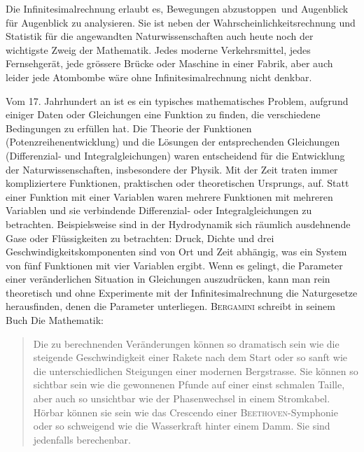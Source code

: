 \documentclass[%
11pt,%
twoside,%
titlepage,%
german,%
headsepline%
]{scrartcl}
\begin{document}
Die Infinitesimalrechnung erlaubt es, \glqq Bewegungen abzustoppen\grqq\ und Augenblick f\"ur Augenblick zu analysieren. Sie ist neben der Wahrscheinlichkeitsrechnung und Statistik f\"ur die angewandten Naturwissenschaften auch heute noch der wichtigste Zweig der Mathematik. Jedes moderne Verkehrsmittel, jedes Fernsehger\"at, jede gr\"ossere Br\"ucke oder Maschine in einer Fabrik, aber auch leider jede Atombombe w\"are ohne Infinitesimalrechnung nicht denkbar.

Vom 17. Jahrhundert an ist es ein typisches mathematisches Problem, aufgrund einiger Daten oder Gleichungen eine Funktion zu finden, die verschiedene Bedingungen zu erf\"ullen hat. Die Theorie der Funktionen (Potenzreihenentwicklung) und die L\"osungen der entsprechenden Gleichungen (Differenzial- und Integralgleichungen) waren entscheidend f\"ur die Entwicklung der Naturwissenschaften, insbesondere der Physik. Mit der Zeit traten immer kompliziertere Funktionen, praktischen oder theoretischen Ursprungs, auf. Statt einer Funktion mit einer Variablen waren mehrere Funktionen mit mehreren Variablen und sie verbindende Differenzial- oder Integralgleichungen zu betrachten. Beispielsweise sind in der Hydrodynamik sich r\"aumlich ausdehnende Gase oder Fl\"ussigkeiten zu betrachten: Druck, Dichte und drei Geschwindigkeitskomponenten sind von Ort und Zeit abh\"angig, was ein System von f\"unf Funktionen mit vier Variablen ergibt.
Wenn es gelingt, die Parameter einer ver\"anderlichen Situation in Gleichungen auszudr\"ucken, kann man rein theoretisch und ohne Experimente mit der Infinitesimalrechnung die Naturgesetze herausfinden, denen die Parameter unterliegen.
\textsc{Bergamini} schreibt in seinem Buch \glqq Die Mathematik\grqq:
\begin{quote}
\glqq Die zu berechnenden Ver\"anderungen k\"onnen so dramatisch sein wie die steigende Geschwindigkeit einer Rakete nach dem Start oder so sanft wie die unterschiedlichen Steigungen einer modernen Bergstrasse. Sie k\"onnen so sichtbar sein wie die gewonnenen Pfunde auf einer einst schmalen Taille, aber auch so unsichtbar wie der Phasenwechsel in einem Stromkabel. H\"orbar k\"onnen sie sein wie das Crescendo einer \textsc{Beethoven}-Symphonie oder so schweigend wie die Wasserkraft hinter einem Damm. Sie sind jedenfalls berechenbar.\grqq
\end{quote}
\end{document}
